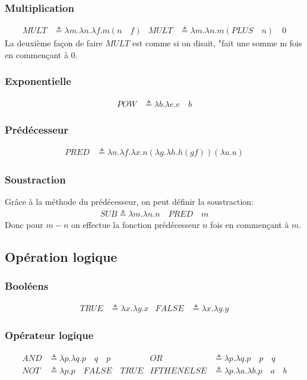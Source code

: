 \documentclass{report}
\begin{document}
\subsubsection{Multiplication}
\begin{align*}
MULT &\triangleq \lambda m.\lambda n.\lambda f.m (n \quad f) & MULT &\triangleq \lambda m.\lambda n.m (PLUS \quad n)\quad 0
\end{align*}
La deuxième façon de faire $MULT$ est comme si on disait, "fait une somme m fois en commençant à 0.

\subsubsection{Exponentielle}
\begin{align*}
POW &\triangleq \lambda b.\lambda e.e \quad b
\end{align*}

\subsubsection{Prédécesseur}
\begin{align*}
PRED &\triangleq \lambda n.\lambda f.\lambda x.n (\lambda g.\lambda h.h (g f)) (\lambda u.u)
\end{align*}

\subsubsection{Soustraction}
Grâce à la méthode du prédécesseur, on peut définir la soustraction:
\begin{align*}
SUB \triangleq \lambda m.\lambda n.n \quad PRED \quad m
\end{align*}
Donc pour $m-n$ on effectue la fonction prédécesseur $n$ fois en commençant à $m$. 

\subsection{Opération logique}

\subsubsection{Booléens}
\begin{align*}
TRUE &\triangleq \lambda x.\lambda y.x & FALSE &\triangleq \lambda x.\lambda y.y
\end{align*}

\subsubsection{Opérateur logique}
\begin{align*}
AND &\triangleq \lambda p.\lambda q.p \quad q \quad p & OR &\triangleq \lambda p.\lambda q.p \quad p \quad q\\
NOT &\triangleq \lambda p.p \quad FALSE \quad TRUE & IFTHENELSE &\triangleq \lambda p.\lambda a.\lambda b.p \quad a \quad b
\end{align*} 
\end{document}
